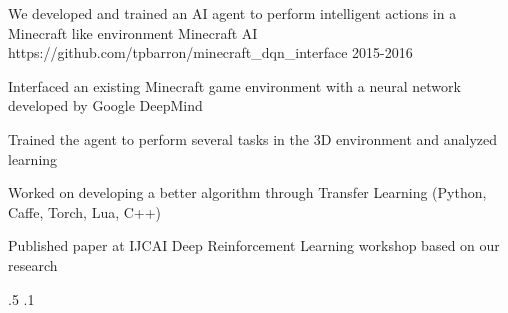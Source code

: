 \begin{cventries}

\vspace{-2.25em}
\myProject
{We developed and trained an AI agent to perform intelligent actions in a Minecraft like environment} %
{Minecraft AI} %
{https://github.com/tpbarron/minecraft\_dqn\_interface} %
{2015-2016} %
{ %
\begin{cvitems}
\item {Interfaced an existing Minecraft game environment with a neural network developed by Google DeepMind}
\item {Trained the agent to perform several tasks in the 3D environment and analyzed learning}
\item {Worked on developing a better algorithm through Transfer Learning (Python, Caffe, Torch, Lua, C++)}
\item {Published paper at IJCAI Deep Reinforcement Learning workshop based on our research}
\end{cvitems}
}
{.5}
{.1}



\end{cventries}
